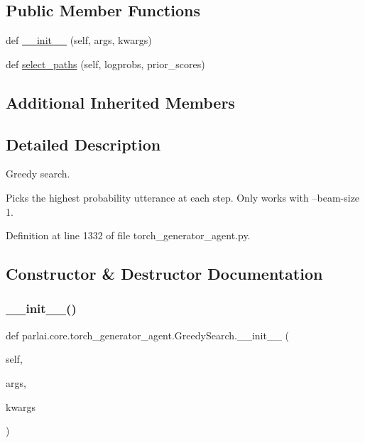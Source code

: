 \subsection*{Public Member Functions}
\begin{DoxyCompactItemize}
\item 
def \hyperlink{classparlai_1_1core_1_1torch__generator__agent_1_1GreedySearch_a3d82930c25aa494772148c51f67d5f0d}{\+\_\+\+\_\+init\+\_\+\+\_\+} (self, args, kwargs)
\item 
def \hyperlink{classparlai_1_1core_1_1torch__generator__agent_1_1GreedySearch_aa201e7824f50e2830cede9adc4bffcd6}{select\+\_\+paths} (self, logprobs, prior\+\_\+scores)
\end{DoxyCompactItemize}
\subsection*{Additional Inherited Members}


\subsection{Detailed Description}
\begin{DoxyVerb}Greedy search.

Picks the highest probability utterance at each step.  Only works with
--beam-size 1.
\end{DoxyVerb}
 

Definition at line 1332 of file torch\+\_\+generator\+\_\+agent.\+py.



\subsection{Constructor \& Destructor Documentation}
\mbox{\label{classparlai_1_1core_1_1torch__generator__agent_1_1GreedySearch_a3d82930c25aa494772148c51f67d5f0d}} 
\subsubsection{\texorpdfstring{\+\_\+\+\_\+init\+\_\+\+\_\+()}{\_\_init\_\_()}}
{\footnotesize\ttfamily def parlai.\+core.\+torch\+\_\+generator\+\_\+agent.\+Greedy\+Search.\+\_\+\+\_\+init\+\_\+\+\_\+ (\begin{DoxyParamCaption}\item[{}]{self,  }\item[{}]{args,  }\item[{}]{kwargs }\end{DoxyParamCaption})}



